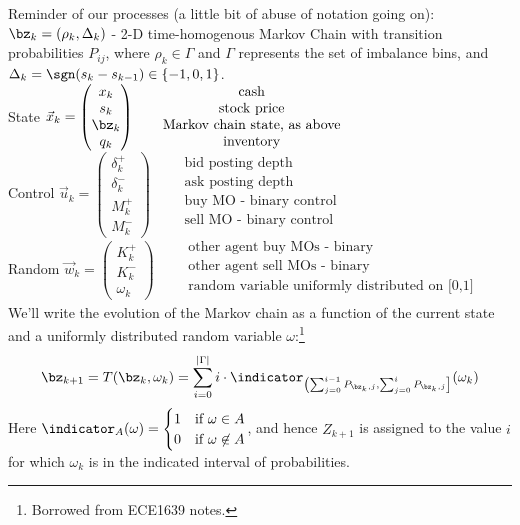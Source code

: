 \documentclass[12pt]{article}
\begin{document}
Reminder of our processes (a little bit of abuse of notation going on):\\
$\bz_k = (\rho_k, \Delta_k)$ - 2-D time-homogenous Markov Chain with transition probabilities $P_{ij}$, where $\rho_k \in \Gamma$ and $\Gamma$ represents the set of imbalance bins, and $\Delta_k = \sgn(s_k - s_{k-1}) \in \{-1,0,1\}$. \\
State $\vec{x}_{k} = \begin{pmatrix}
x_k \\
s_k \\
\bz_k \\
q_k 
\end{pmatrix} \qquad \begin{matrix}
\text{cash} \\
\text{stock price} \\
\text{Markov chain state, as above} \\
\text{inventory} \\
\end{matrix}$ \\
Control $\vec{u}_{k} = \begin{pmatrix}
\delta_k^+ \\
\delta_k^- \\
M_k^+ \\
M_k^-
\end{pmatrix} \qquad \begin{matrix}
\text{bid posting depth} \\
\text{ask posting depth} \\
\text{buy MO - binary control} \\
\text{sell MO - binary control} \\
\end{matrix}$ \\
Random $\vec{w}_{k} = \begin{pmatrix}
K_k^+ \\
K_k^- \\
\omega_k
\end{pmatrix} \qquad \begin{matrix}
\text{other agent buy MOs - binary} \\
\text{other agent sell MOs - binary} \\
\text{random variable uniformly distributed on [0,1]} \\
\end{matrix}$ \\

We'll write the evolution of the Markov chain as a function of the current state and a uniformly distributed random variable $\omega$:\footnote{Borrowed from ECE1639 notes.}
\begin{equation}
\bz_{k+1} = T(\bz_k, \omega_k) = \sum_{i=0}^{|\Gamma|} i \cdot \indicator_{\left( \sum_{j=0}^{i-1} P_{\bz_k,j} , \sum_{j=0}^{i} P_{\bz_k,j} \right]} (\omega_k)
\end{equation}
Here $\indicator_A(\omega) = \begin{cases} 1 & \text{if } \omega \in A \\
0 & \text{if } \omega \not\in A
\end{cases}$, and hence $Z_{k+1}$ is assigned to the value $i$ for which $\omega_k$ is in the indicated interval of probabilities.
\end{document}
